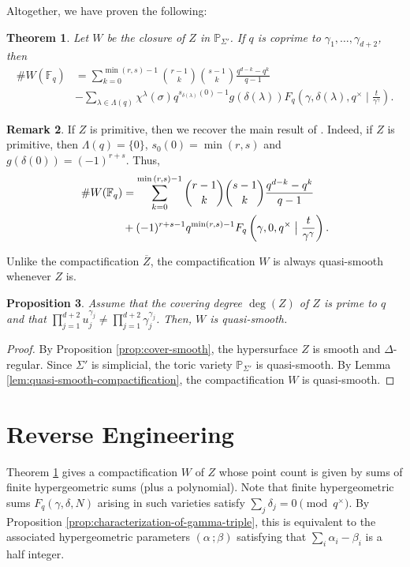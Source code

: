 \documentclass[11pt, reqno]{amsart}
\theoremstyle{plain}
\newtheorem{theo}{Theorem}[section]
\newtheorem{prop}[theo]{Proposition}
\theoremstyle{definition}
\newtheorem{rem}[theo]{Remark}
\newcommand{\Ps}{\mathbb{P}}
\newcommand{\ga}{\gamma}
\newcommand{\be}{\beta}
\newcommand{\al}{\alpha}
\begin{document}
Altogether, we have proven the following:
\begin{theo}\label{theo:main-desingularization}
Let $W$ be the closure of $Z$ in $\Ps_{\Sigma'}$. 
If $q$ is coprime to $\ga_1,\dots,\ga_{d+2}$, then 
\begin{align*}
\#W (\mathbb{F}_q) &= \sum_{k=0}^{\min{(r,s)-1}} {\binom{r-1}{k}}{\binom{s-1}{k}} \frac{q^{d-k} - q^{k} }{q-1}\\
&-\sum_{\lambda \in \Lambda(q)}\chi^{\lambda}(\sigma) q^{s_{\delta(\lambda)} (0)-1} g\left(\delta(\lambda)\right) F_q\left(\gamma,\delta(\lambda), q^\times \mid \frac{t}{\gamma^\gamma}\right).
\end{align*}
\end{theo}

\begin{rem}
    If $Z$ is primitive, then we recover the main result of \cite[Theorem 1.5]{BCM}.
    Indeed, if $Z$ is primitive, then $\Lambda(q)= \{0\}$, $s_{0}(0) =\min(r,s)$ and $g\left(\delta(0)\right) =(-1)^{r+s}$. Thus,
    \begin{align*}
    \#W (\mathbb{F}_q) &= \sum_{k=0}^{\min{(r,s)-1}} {\binom{r-1}{k}}{\binom{s-1}{k}} \frac{q^{d-k} - q^{k} }{q-1}\\
    &+(-1)^{r+s-1} q^{\min(r,s) -1}  F_q\left(\gamma,0, q^\times \bigm\vert  \frac{t}{\gamma^\gamma}\right).
    \end{align*}
\end{rem}
Unlike the compactification $\overline{Z}$, the compactification $W$ is always quasi-smooth whenever $Z$ is.  
\begin{prop}\label{prop:bcm-quasi-smooth}
Assume that the covering degree $\deg(Z)$ of $Z$ is prime to $q$ and that $\prod_{j=1}^{d+2} u_{j}^{\ga_j} \neq \prod_{j=1}^{d+2} \ga_j^{\ga_j}$. Then, $W$ is quasi-smooth. 
\end{prop}
\begin{proof}
By Proposition \ref{prop:cover-smooth}, the hypersurface $Z$ is smooth and $\Delta$-regular. Since $\Sigma'$ is simplicial, the toric variety $\Ps_{\Sigma'}$ is quasi-smooth. By Lemma \ref{lem:quasi-smooth-compactification}, the compactification $W$ is quasi-smooth.
\end{proof}

\section{Reverse Engineering}\label{section:reverse-engineering}
Theorem \ref{theo:main-desingularization} gives a compactification $W$ of $Z$ whose point count is given by sums of finite hypergeometric sums (plus a polynomial).  Note that finite hypergeometric sums $F_q(\ga,\delta,N)$ arising in such varieties satisfy $\sum_{j} \delta_j =0 \pmod{q^\times}$.
By Proposition \ref{prop:characterization-of-gamma-triple}, this is equivalent to the associated hypergeometric parameters $(\al \,;\be)$ satisfying that $\sum_{i} \al_i - \be_i$ is a half integer.    
\end{document}
